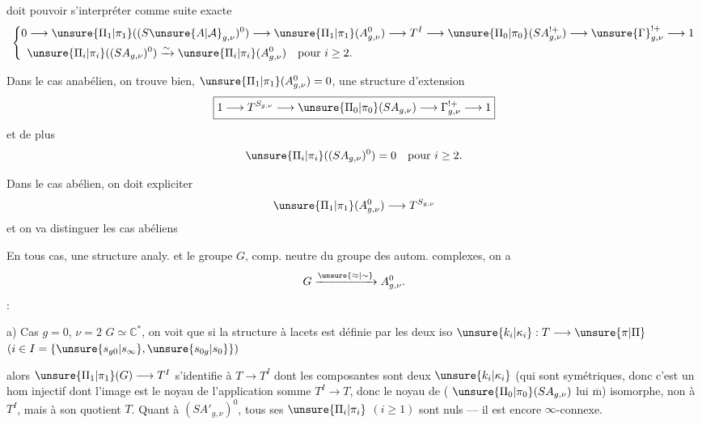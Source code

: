 

doit pouvoir s'interpréter comme suite exacte
\[
\left\{\begin{aligned}
0&\longrightarrow\unsure{\Pi_1|\pi_1}((S\unsure{A|\mathcal A}_{g,\nu})^0)
\longrightarrow\unsure{\Pi_1|\pi_1}(A_{g,\nu}^0)
\longrightarrow T^I\longrightarrow\unsure{\Pi_0|\pi_0}(SA_{g,\nu}^{!+})
\longrightarrow\unsure{\Gamma}_{g,\nu}^{!+}\longrightarrow1\\
&\unsure{\Pi_i|\pi_i}((SA_{g,\nu})^0)\xrightarrow{\sim}
\unsure{\Pi_i|\pi_i}(A_{g,\nu}^0)\quad\text{pour }i\geq2.
\end{aligned}\right.
\]

Dans le cas anabélien, on trouve bien, 
$\unsure{\Pi_1|\pi_1}(A_{g,\nu}^0)=0$, une structure d'extension
\[
\boxed{1\longrightarrow T^{S_{g,\nu}}\longrightarrow
\unsure{\Pi_0|\pi_0}(SA_{g,\nu})\longrightarrow\Gamma_{g,\nu}^{!+}\longrightarrow1}
\]
et de plus
\[
\unsure{\Pi_i|\pi_i}((SA_{g,\nu})^0)=0\quad\text{pour }i\geq2.
\]

Dans le cas abélien, on doit expliciter
\[
\unsure{\Pi_1|\pi_1}(A_{g,\nu}^0)\longrightarrow T^{S_{g,\nu}}
\]
et on va distinguer les  cas abéliens

En tous cas,  une structure analy.  et le groupe $G$, comp. neutre du groupe des autom. complexes, on a
\[
G\xrightarrow{\unsure{\approx|\sim}}A_{g,\nu}^0.
\]
 :

a) Cas $g=0$, $\nu=2$ 
$G\simeq\mathbb C^*$, 
on voit que si la structure à lacets  est définie par les deux iso
$\unsure{k_i|\kappa_i}:T\longrightarrow\unsure{\pi|\Pi}$
$(i\in I=\{\unsure{s_{g0}|s_\infty},\unsure{s_{0g}|s_0}\})$



alors $\unsure{\Pi_1|\pi_1}(G)\longrightarrow T^I$ s'identifie à
$T\longrightarrow T^I$ dont les composantes sont  deux
$\unsure{k_i|\kappa_i}$ (qui sont symétriques, donc c'est un hom injectif dont l'image est le noyau de l'application somme
$T^I\longrightarrow T$, donc  le noyau de
( $\unsure{\Pi_0|\pi_0}(SA_{g,\nu})$ lui $\overline{\mathrm m}$)
 isomorphe, non à $T^I$, mais à son quotient $T$.
Quant à $(SA'_{g,\nu})^0$, tous ses $\unsure{\Pi_i|\pi_i}$ $(i\geq1)$ sont nuls --- il est encore $\infty$-connexe.

